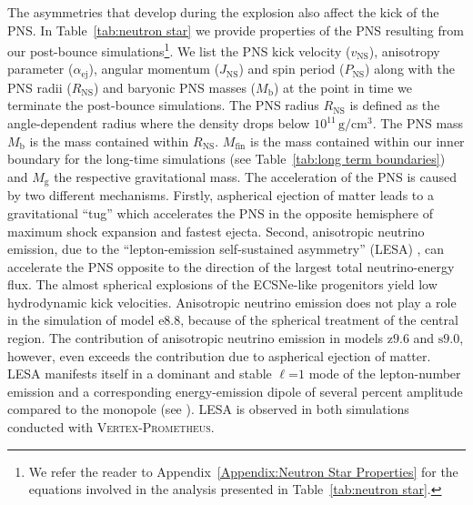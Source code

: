 \documentclass[fleqn,usenatbib]{mnras}
\newcommand{\vertexprom}{\textsc{Vertex-Prometheus}\xspace}
\newcommand{\rns}{\ensuremath{R_{\mathrm{NS}}}\xspace}
\newcommand{\onemg}{\ensuremath{\mathrm{e8.8}}\xspace}
\newcommand{\snine}{\ensuremath{\mathrm{s9.0}}\xspace}
\newcommand{\znine}{\ensuremath{\mathrm{z9.6}}\xspace}
\newcommand{\GEO}[1]{{\color{red}#1}}
\begin{document}
The asymmetries that develop during the explosion also affect the kick of the PNS.
In Table~\ref{tab:neutron star} we provide properties of the PNS resulting from our post-bounce simulations\footnote{We refer the reader to Appendix~\ref{Appendix:Neutron Star Properties} for the equations involved in the analysis presented in Table~\ref{tab:neutron star}.}. We list the PNS kick velocity ($v_{\mathrm{NS}}$), anisotropy parameter ($\alpha_{\mathrm{ej}}$), angular momentum ($J_{\mathrm{NS}}$) and spin period ($P_{\mathrm{NS}}$) along with the PNS radii (\rns) and baryonic PNS masses ($M_{\mathrm{b}}$) at the point in time we terminate the post-bounce simulations. The PNS radius $\rns$ is defined as the angle-dependent radius where the density drops below $10^{11}\,\mathrm{g/cm^3}$. The PNS mass $M_{\mathrm{b}}$ is the mass contained within $\rns$. $M_{\mathrm{fin}}$ is the mass contained within our inner boundary for the long-time simulations (see Table~\ref{tab:long term boundaries}) and $M_{\mathrm{g}}$ the respective gravitational mass.
The acceleration of the PNS is caused by two different mechanisms.
\GEO{Firstly, aspherical ejection of matter leads to a gravitational ``tug'' which accelerates the PNS in the opposite hemisphere of maximum shock expansion and fastest ejecta. Second, anisotropic neutrino emission, due to the ``lepton-emission self-sustained asymmetry'' (LESA) \citep{Tamborra2014}, can accelerate the PNS opposite to the direction of the largest total neutrino-energy flux.
The almost spherical explosions of the ECSNe-like progenitors yield low hydrodynamic kick velocities. Anisotropic neutrino emission does not play a role in the simulation of model \onemg, because of the spherical treatment of the central region. The contribution of anisotropic neutrino emission in models \znine and \snine, however, even exceeds the contribution due to aspherical ejection of matter. LESA manifests itself in a dominant and stable $\ell\mathord{=}1$ mode of the lepton-number emission and a corresponding energy-emission dipole of several percent amplitude compared to the monopole (see \citealt{Tamborra2014}). LESA is observed in both simulations conducted with \vertexprom. }
\end{document}

